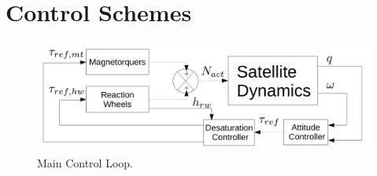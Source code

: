 \chapter{Control Schemes}

\begin{figure}[h!]
	\centering 
	\includegraphics[width=170mm]{figures/mainLoop.pdf}	
	\caption{Main Control Loop.}
	\label{label{fig:mainLoop}}
\end{figure}





